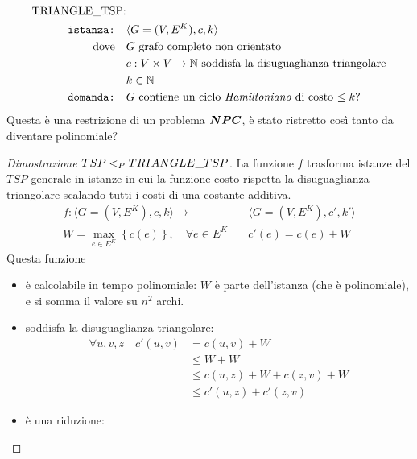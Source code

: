 \begin{align*}
    \text{TRIANGLE\_TSP:} & \quad \\
    \texttt{istanza:} \quad & \langle G=(V,E^K), c, k \rangle \\
    \text{dove} \quad & G \text{ grafo completo non orientato} \\
    & c : V \times V \to \mathbb{N} \text{ soddisfa la disuguaglianza triangolare}\\
    & k \in \mathbb{N} \\
    \texttt{domanda:} \quad & G \text{ contiene un ciclo \emph{Hamiltoniano} di costo $\leq k$?}
\end{align*}
Questa è una restrizione di un problema $\bm{NPC}$, è stato ristretto così tanto da diventare polinomiale?
\begin{proof}[Dimostrazione $TSP <_P TRIANGLE\_TSP$]
    La funzione $f$ trasforma istanze del $TSP$ generale in istanze in cui la funzione costo rispetta la disuguaglianza triangolare scalando tutti i costi di una costante additiva.
    \begin{align*}
        f :
        \langle
        G = (V,E^K), c, k
        \rangle
        \to
        &
        \langle
        G = (V,E^K), c', k'
        \rangle
        \\
        W
        =
        \max_{e \in E^K} \left\{ c \left( e \right) \right\}
        ,
        \quad
        \forall e \in E^K
        \quad
        &
        c'(e)
        =
        c(e) + W
    \end{align*}
    Questa funzione 
    \begin{itemize}
        \item è calcolabile in tempo polinomiale: $W$ è parte dell'istanza (che è polinomiale), e si somma il valore su $n^2$ archi.
        \item soddisfa la disuguaglianza triangolare:
            \begin{align*}
                \forall u,v,z
                \quad
                c'(u,v)
                &= 
                c(u,v) + W
                \\
                & \leq
                W + W
                \\
                & \leq
                c(u,z) + W + c(z,v) + W
                \\
                & \leq
                c'(u,z) + c'(z,v)
            \end{align*}
        \item è una riduzione:

\end{itemize}
\end{proof}
